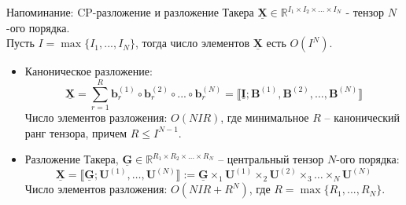 
\usepackage{tikz}
\usepackage{amsmath}
\usepackage[english,russian]{babel}
\usepackage[labelformat=empty]{caption}

\usepackage{graphicx,animate}
\usepackage{animate}
\usepackage{svg}
\usepackage{subcaption}

\usepackage{ stmaryrd }

\usetikzlibrary{arrows,shapes,positioning,shadows,trees}
\newcommand*{\defeq}{\stackrel{\text{def}}{=}}
\newcommand{\tensor}[1]{\underline{\textbf{#1}}}
\newcommand{\M}[1]{\textbf{#1}}
\newcommand{\norm}[1]{\lVert #1 \rVert }

\begin{frame}[plain]
\titlepage
\end{frame}
\begin{frame}{Напоминание: CP-разложение и разложение Такера}
$\tensor{X} \in \mathbb{R}^{I_1 \times I_2 \times \dots \times I_N}$ - тензор $N$-ого порядка. \\
Пусть $I = \max\{I_1, ..., I_N\}$, тогда число элементов $\tensor{X}$ есть $O(I^N)$.
\begin{itemize}
    \item Каноническое разложение: 
    $$\tensor{X} = \sum_{r=1}^R \M{b}_r^{(1)} \circ \M{b}_r^{(2)} \circ ... \circ \M{b}_r^{(N)} =  \llbracket \tensor{I}; \M{B}^{(1)}, \M{B}^{(2)}, \dots,  \M{B}^{(N)} \rrbracket$$
    Число элементов разложения: $O(NIR)$, где минимальное $R$ -- канонический ранг тензора, причем $R \leq I^{N-1}$.
    \item Разложение Такера, $\tensor{G} \in \mathbb{R}^{R_1 \times R_2 \times \dots \times R_N}$ -- центральный тензор $N$-ого порядка:
    $$ \tensor{X} = \llbracket \tensor{G}; \M{U}^{(1)}, \dots, \M{U}^{(N)} \rrbracket := \tensor{G} \times_1 \M{U}^{(1)} \times_2 \M{U}^{(2)} \times_3 \dots \times_N \M{U}^{(N)} $$
    Число элементов разложения: $O(NIR + R^N)$, где $R = \max\{R_1, ..., R_N\}$.
    
\end{itemize}
\end{frame}

